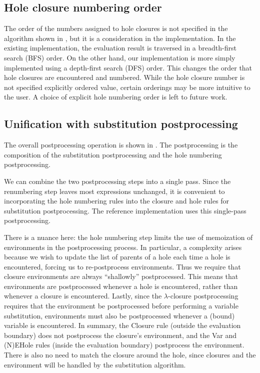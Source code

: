\subsection{Hole closure numbering order}
\label{sec:numbering-order}

The order of the numbers assigned to hole closures is not specified in the algorithm shown in , but it is a consideration in the implementation. In the existing implementation, the evaluation result is traversed in a breadth-first search (BFS) order. On the other hand, our implementation is more simply implemented using a depth-first search (DFS) order. This changes the order that hole closures are encountered and numbered. While the hole closure number is not specified explicitly ordered value, certain orderings may be more intuitive to the user. A choice of explicit hole numbering order is left to future work.

\subsection{Unification with substitution postprocessing}
\label{sec:unification-postprocessing}

The overall postprocessing operation is shown in . The postprocessing is the composition of the substitution postprocessing and the hole numbering postprocessing.

We can combine the two postprocessing steps into a single pass. Since the renumbering step leaves most expressions unchanged, it is convenient to incorporating the hole numbering rules into the closure and hole rules for substitution postprocessing. The reference implementation uses this single-pass postprocessing.

There is a nuance here: the hole numbering step limits the use of memoization of environments in the postprocessing process. In particular, a complexity arises because we wish to update the list of parents of a hole each time a hole is encountered, forcing us to re-postprocess environments. Thus we require that closure environments are always ``shallowly'' postprocessed. This means that environments are postprocessed whenever a hole is encountered, rather than whenever a closure is encountered. Lastly, since the $\lambda$-closure postprocessing requires that the environment be postprocessed before performing a variable substitution, environments must also be postprocessed whenever a (bound) variable is encountered. In summary, the \pplcl{}Closure rule (outside the evaluation boundary) does not postprocess the closure's environment, and the \pplcl{}Var and \pplcl{}(N)EHole rules (inside the evaluation boundary) postprocess the environment. There is also no need to match the closure around the hole, since closures and the environment will be handled by the substitution algorithm.

